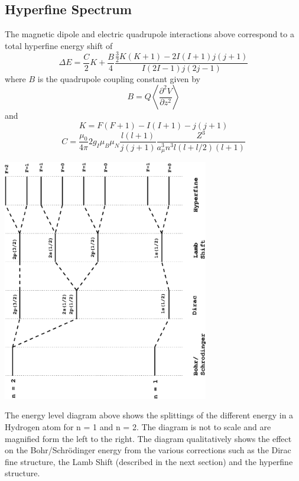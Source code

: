 \documentclass[a4paper]{serif}
\begin{document}
    \subsection{Hyperfine Spectrum}
    The magnetic dipole and electric quadrupole interactions above correspond to 
    a total hyperfine energy shift of
    \begin{displaymath}
        \Delta E = \frac{C}{2}K + \frac{B}{4} 
                   \frac{\frac{3}{2}K(K+1)-2I(I+1)j(j+1)}{I(2I-1)j(2j-1)}
    \end{displaymath}
    where $B$ is the quadrupole coupling constant given by
    \begin{displaymath}
        B = Q \left \langle \frac{\partial^2 V}{\partial z^2} \right \rangle
    \end{displaymath}
    and
    \begin{displaymath}
        K = F(F+1) - I(I+1) - j(j+1)
    \end{displaymath}
    \begin{displaymath}
         C = \frac{\mu_0}{4\pi} 2g_I \mu_B \mu_N \frac{l(l+1)}{j(j+1)}
            \frac{Z^3}{a_{\mu}^{3} n^3 l (l + l/2)(l+1)} 
    \end{displaymath}

    \begin{center}
        \includegraphics[angle=-90,width=9cm]{all.eps}
    \end{center}

    The energy level diagram above shows the splittings of the different energy
    in a Hydrogen atom for n = 1 and n = 2. The diagram is not to scale and
    are magnified form the left to the right. The diagram qualitatively shows
    the effect on the Bohr/Schr\"odinger energy from the various corrections
    such as the Dirac fine structure, the Lamb Shift (described in the 
    next section) and the hyperfine structure.
\end{document}
